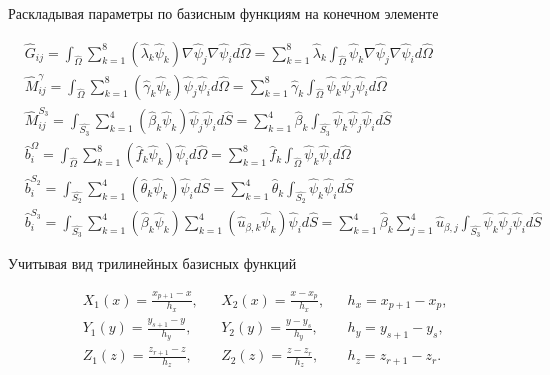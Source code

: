 \documentclass[12pt]{article}
\begin{document}
\vskip 2mm
\noindent Раскладывая параметры по базисным функциям на конечном элементе

\begin{align}
  &\hat{G}_{ij} = \int_{\hat{\Omega}}
    \sum_{k=1}^{8}(\hat{\lambda}_{k}\hat{\psi}_k)
    \nabla\hat{\psi}_j
    \nabla\hat{\psi}_i d\hat{\Omega} 
  = \sum_{k=1}^{8}\hat{\lambda}_{k}\int_{\hat{\Omega}}
    \hat{\psi}_k
    \nabla\hat{\psi}_j
    \nabla\hat{\psi}_i d\hat{\Omega} \\
  &\hat{M}^{\gamma}_{ij} = \int_{\hat{\Omega}}
    \sum_{k=1}^{8}(\hat{\gamma}_{k}\hat{\psi}_k)
    \hat{\psi}_j
    \hat{\psi}_i d\hat{\Omega} 
  = \sum_{k=1}^{8}\hat{\gamma}_{k}\int_{\hat{\Omega}}
    \hat{\psi}_k
    \hat{\psi}_j
    \hat{\psi}_i d\hat{\Omega} \\
  &\hat{M}^{S_3}_{ij} = \int_{\hat{S_3}}
    \sum_{k=1}^{4}(\hat{\beta}_{k}\hat{\psi}_k)
    \hat{\psi}_j
    \hat{\psi}_i d\hat{S}
  = \sum_{k=1}^{4}\hat{\beta}_{k}\int_{\hat{S_3}}
    \hat{\psi}_k
    \hat{\psi}_j
    \hat{\psi}_i d\hat{S} \\
  &\hat{b}^{\Omega}_{i} = \int_{\hat{\Omega}}
    \sum_{k=1}^{8}(\hat{f}_{k}\hat{\psi}_k)
    \hat{\psi}_i d\hat{\Omega} 
  = \sum_{k=1}^{8}\hat{f}_{k}\int_{\hat{\Omega}}
    \hat{\psi}_k
    \hat{\psi}_i d\hat{\Omega} \\
  &\hat{b}^{S_2}_{i} = \int_{\hat{S_2}}
    \sum_{k=1}^{4}(\hat{\theta}_{k}\hat{\psi}_k)
    \hat{\psi}_i d\hat{S} 
  = \sum_{k=1}^{4}\hat{\theta}_{k}\int_{\hat{S_2}}
    \hat{\psi}_k
    \hat{\psi}_i d\hat{S} \\
  &\hat{b}^{S_3}_{i} = \int_{\hat{S_3}}
    \sum_{k=1}^{4}(\hat{\beta}_{k}\hat{\psi}_k)
    \sum_{k=1}^{4}(\hat{u}_{\beta, k}\hat{\psi}_k)
    \hat{\psi}_i d\hat{S}
  = \sum_{k=1}^{4}\hat{\beta}_{k}\sum_{j=1}^{4}
    \hat{u}_{\beta, j}
    \int_{\hat{S_3}}\hat{\psi}_k\hat{\psi}_j\hat{\psi}_i d\hat{S}
\end{align}

\vskip 2mm
\noindent Учитывая вид трилинейных базисных функций

\begin{align*}
  & X_1(x) = \frac{x_{p+1}-x}{h_x}, & &X_2(x) = \frac{x - x_{p}}{h_x}, & &h_x = x_{p+1} - x_p, \\
  & Y_1(y) = \frac{y_{s+1}-y}{h_y}, & &Y_2(y) = \frac{y - y_{s}}{h_y}, & &h_y = y_{s+1} - y_s, \\
  & Z_1(z) = \frac{z_{r+1}-z}{h_z}, & &Z_2(z) = \frac{z - z_{r}}{h_z}, & &h_z = z_{r+1} - z_r.
\end{align*}
\end{document}
